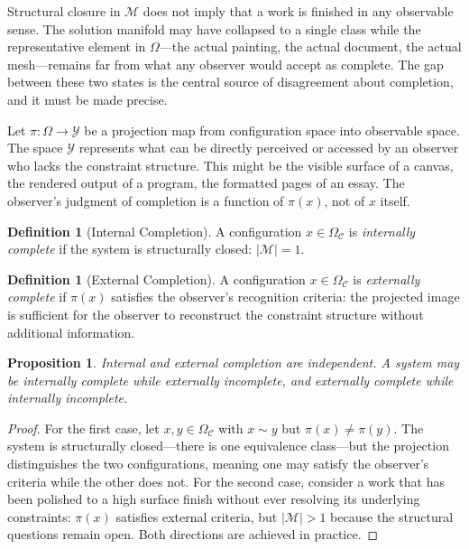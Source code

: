 \documentclass[12pt, twoside]{article}
\theoremstyle{plain}
\newtheorem{proposition}[theorem]{Proposition}
\theoremstyle{definition}
\newtheorem{definition}[theorem]{Definition}
\theoremstyle{remark}
\newcommand{\OmC}{\Omega_{\mathcal{C}}}
\begin{document}
Structural closure in $\mathcal{M}$ does not imply that a work is finished in any observable sense. The solution manifold may have collapsed to a single class while the representative element in $\Omega$---the actual painting, the actual document, the actual mesh---remains far from what any observer would accept as complete. The gap between these two states is the central source of disagreement about completion, and it must be made precise.

Let $\pi : \Omega \to \mathcal{Y}$ be a projection map from configuration space into observable space. The space $\mathcal{Y}$ represents what can be directly perceived or accessed by an observer who lacks the constraint structure. This might be the visible surface of a canvas, the rendered output of a program, the formatted pages of an essay. The observer's judgment of completion is a function of $\pi(x)$, not of $x$ itself.

\begin{definition}[Internal Completion]
A configuration $x \in \OmC$ is \emph{internally complete} if the system is structurally closed: $|\mathcal{M}| = 1$.
\end{definition}

\begin{definition}[External Completion]
A configuration $x \in \OmC$ is \emph{externally complete} if $\pi(x)$ satisfies the observer's recognition criteria: the projected image is sufficient for the observer to reconstruct the constraint structure without additional information.
\end{definition}

\begin{proposition}
\label{prop:noncoincidence}
Internal and external completion are independent. A system may be internally complete while externally incomplete, and externally complete while internally incomplete.
\end{proposition}

\begin{proof}
For the first case, let $x, y \in \OmC$ with $x \sim y$ but $\pi(x) \neq \pi(y)$. The system is structurally closed---there is one equivalence class---but the projection distinguishes the two configurations, meaning one may satisfy the observer's criteria while the other does not. For the second case, consider a work that has been polished to a high surface finish without ever resolving its underlying constraints: $\pi(x)$ satisfies external criteria, but $|\mathcal{M}| > 1$ because the structural questions remain open. Both directions are achieved in practice.
\end{proof}
\end{document}
